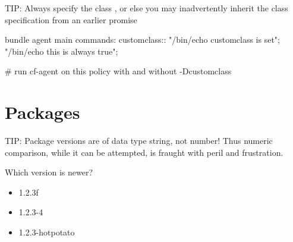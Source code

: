 TIP: Always specify the class , or else you may inadvertently inherit the class specification from an earlier promise

\begin{codelisting}
\begin{code}
bundle agent main {
  commands:
    customclass::
      "/bin/echo customclass is set";
      "/bin/echo this is always true";
}

# run cf-agent on this policy with and without -Dcustomclass
\end{code}
\end{codelisting}
\begin{codelisting}
\end{codelisting}





\section{Packages}





TIP: Package versions are of data type string, not number!  Thus numeric comparison, while it can be attempted, is fraught with peril and frustration.

Which version is newer?

\begin{itemize}
\item{} 1.2.3f
\item{} 1.2.3-4
\item{} 1.2.3-hotpotato
\end{itemize}

